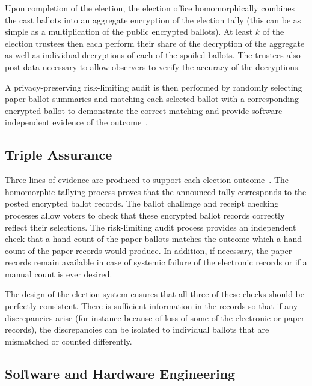 Upon completion of the election, the election office homomorphically combines the cast ballots into an aggregate encryption of the election tally (this can be as simple as a multiplication of the public encrypted ballots).  At least $k$ of the election trustees then each perform their share of the decryption of the aggregate as well as individual decryptions of each of the spoiled ballots.  The trustees also post data necessary to allow observers to verify the accuracy of the decryptions.

A privacy-preserving risk-limiting audit is then performed by randomly selecting paper ballot summaries and matching each selected ballot with a corresponding encrypted ballot to demonstrate the correct matching and provide software-independent evidence of the outcome~\cite{rivest06sivoting,lindemanStark12}.

\subsection{Triple Assurance}

Three lines of evidence are produced to support each election outcome~\cite{starkWagner12}.  The homomorphic tallying process proves that the announced tally corresponds to the posted encrypted ballot records.  The ballot challenge and receipt checking processes allow voters to check that these encrypted ballot records correctly reflect their selections.  The risk-limiting audit process provides an independent check that a hand count of the paper ballots matches the outcome which a hand count of the paper records would produce.  In addition, if necessary, the paper records remain available in case of systemic failure of the electronic records or if a manual count is ever desired.

The design of the election system ensures that all three of these checks should be perfectly consistent.  There is sufficient information in the records so that if any discrepancies arise (for instance because of loss of some of the electronic or paper records), the discrepancies can be isolated to individual ballots that are mismatched or counted differently.

\subsection{Software and Hardware Engineering}

